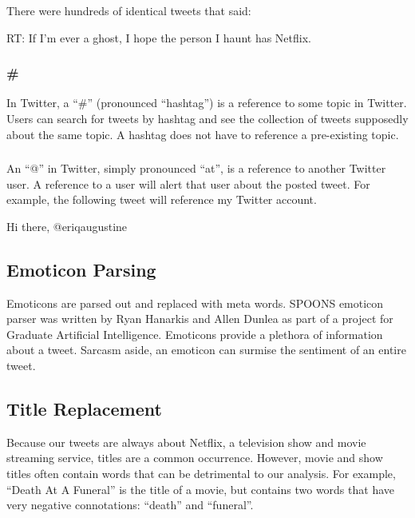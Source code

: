 \documentclass[12pt]{ucthesis}
\begin{document}
There were hundreds of identical tweets that said:

\begin{center}
   RT: If I'm ever a ghost, I hope the person I haunt has Netflix.
\end{center}

\subsubsection{\#}
\label{class-twitter-symbols-hash}
In Twitter, a ``\#'' (pronounced ``hashtag'') is a reference to some topic in Twitter.
Users can search for tweets by hashtag and see the collection of tweets supposedly about the
same topic. A hashtag does not have to reference a pre-existing topic.

\subsubsection{\@}
\label{class-twitter-symbols-at}
An ``@'' in Twitter, simply pronounced ``at'', is a reference to another Twitter user.
A reference to a user will alert that user about the posted tweet.
For example, the following tweet will reference my Twitter account.

\begin{center}
Hi there, @eriqaugustine
\end{center}

\subsection{Emoticon Parsing}
\label{class-filter-emoticon}
Emoticons are parsed out and replaced with meta words.
SPOONS emoticon parser was written by Ryan Hanarkis and Allen Dunlea as part of a project for Graduate Artificial Intelligence.
Emoticons provide a plethora of information about a tweet. Sarcasm aside,
an emoticon can surmise the sentiment of an entire tweet.

\subsection{Title Replacement}
\label{class-filter-title}
Because our tweets are always about Netflix, a television show and movie streaming service,
titles are a common occurrence. However, movie and show titles often contain words that can be
detrimental to our analysis. For example, ``Death At A Funeral'' is the title of a movie, but contains
two words that have very negative connotations: ``death'' and ``funeral''.
\end{document}
